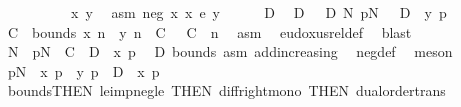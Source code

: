 \begin{isabellebody}
\ \ \isacommand{{\isacharbraceleft}{\kern0pt}}\isamarkupfalse%
\ \isanewline
\ \ \ \ \isamarkupfalse%
\ x\ y\ \isamarkupfalse%
\ asm{\isacharcolon}{\kern0pt}\ {\isachardoublequoteopen}neg\ x{\isachardoublequoteclose}\ {\isachardoublequoteopen}x\ {\isasymsim}\isactrlsub e\ y{\isachardoublequoteclose}\isanewline
\ \ \ \ \isamarkupfalse%
\ D\ \isamarkupfalse%
\ D{\isacharcolon}{\kern0pt}\ {\isachardoublequoteopen}{}\ {\isasymle}\ D{\isachardoublequoteclose}\ {\isachardoublequoteopen}{\isasymforall}N{\isachardot}{\kern0pt}\ {\isasymexists}p{\isasymge}N{\isachardot}{\kern0pt}\ {\isasymnot}\ {\isacharminus}{\kern0pt}\ D\ {\isasymge}\ y\ p{\isachardoublequoteclose}\isanewline
\ \ \ \ \isamarkupfalse%
\ C\ \ bounds{\isacharcolon}{\kern0pt}\ {\isachardoublequoteopen}{\isasymbar}x\ n\ {\isacharminus}{\kern0pt}\ y\ n{\isasymbar}\ {\isasymle}\ C{\isachardoublequoteclose}\ {\isachardoublequoteopen}{}\ {\isasymle}\ C{\isachardoublequoteclose}\ \ n\ \isamarkupfalse%
\ asm\ \isamarkupfalse%
\ eudoxus{\isacharunderscore}{\kern0pt}rel{\isacharunderscore}{\kern0pt}def\ \isamarkupfalse%
\ blast\isanewline
\ \ \ \ \isamarkupfalse%
\ N\ \ {\isachardoublequoteopen}{\isasymforall}p{\isasymge}N{\isachardot}{\kern0pt}\ {\isacharminus}{\kern0pt}\ {\isacharparenleft}{\kern0pt}C\ {\isacharplus}{\kern0pt}\ D{\isacharparenright}{\kern0pt}\ {\isasymge}\ x\ p{\isachardoublequoteclose}\ \isamarkupfalse%
\ D\ bounds\ asm\ add{\isacharunderscore}{\kern0pt}increasing{}\ \isamarkupfalse%
\ neg{\isacharunderscore}{\kern0pt}def\ \isamarkupfalse%
\ meson\isanewline
\ \ \ \ \isamarkupfalse%
\ {\isachardoublequoteopen}{\isasymforall}p{\isasymge}N{\isachardot}{\kern0pt}\ {\isacharminus}{\kern0pt}\ {\isasymbar}x\ p\ {\isacharminus}{\kern0pt}\ y\ p{\isasymbar}\ {\isacharminus}{\kern0pt}\ D\ {\isasymge}\ x\ p{\isachardoublequoteclose}\ \isamarkupfalse%
\ bounds{\isacharparenleft}{\kern0pt}{}{\isacharparenright}{\kern0pt}{\isacharbrackleft}{\kern0pt}THEN\ le{\isacharunderscore}{\kern0pt}imp{\isacharunderscore}{\kern0pt}neg{\isacharunderscore}{\kern0pt}le{\isacharcomma}{\kern0pt}\ THEN\ diff{\isacharunderscore}{\kern0pt}right{\isacharunderscore}{\kern0pt}mono{\isacharcomma}{\kern0pt}\ THEN\ dual{\isacharunderscore}{\kern0pt}order{\isachardot}{\kern0pt}trans{\isacharbrackright}{\kern0pt}\ \isamarkupfalse%

\end{isabellebody}
